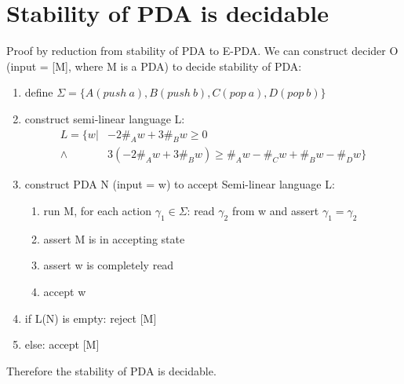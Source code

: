 \documentclass{article}
\begin{document}
\section{Stability of PDA is decidable}
Proof by reduction from stability of PDA to E-PDA. We can construct decider O 
(input = [M], where M is a PDA) to decide stability of PDA:
\begin{enumerate}
	\item define $ \Sigma = \{A(push \ a), B(push \ b), C(pop \ a), D(pop \ 
	b)\} $
	\item construct semi-linear language L:
	\begin{align*}
		L = \{w | & -2\#_Aw + 3\#_Bw \ge 0 \\
		\land & 3(-2\#_Aw + 3\#_Bw) \ge \#_Aw-\#_Cw + \#_Bw-\#_Dw\}
	\end{align*}
	\item construct PDA N (input = w) to accept Semi-linear language L:
	\begin{enumerate}
		\item run M, for each action $ \gamma_1 \in \Sigma $: read $ \gamma_2 $ 
		from w and assert $ \gamma_1 = \gamma_2 $
		\item assert M is in accepting state
		\item assert w is completely read
		\item accept w
	\end{enumerate}
	\item if L(N) is empty: reject [M]
	\item else: accept [M]
\end{enumerate}
Therefore the stability of PDA is decidable.
\end{document}
